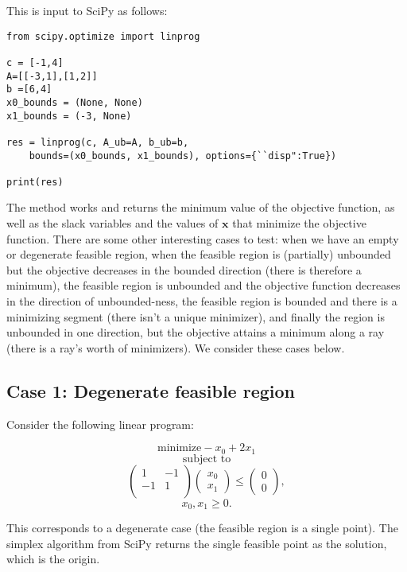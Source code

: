 \documentclass[12pt,english]{article}
\begin{document}
\noindent This is input to SciPy as follows:

\begin{lstlisting}
from scipy.optimize import linprog

c = [-1,4]
A=[[-3,1],[1,2]]
b =[6,4]
x0_bounds = (None, None)
x1_bounds = (-3, None)

res = linprog(c, A_ub=A, b_ub=b, 
	bounds=(x0_bounds, x1_bounds), options={``disp":True})
	
print(res)

\end{lstlisting}

The method works and returns the minimum value of the objective function, as well as the slack variables and the values of $\mathbf{x}$ that minimize the objective function.  There are some other interesting cases to test: when we have an empty or degenerate feasible region, when the feasible region is (partially) unbounded but the objective decreases in the bounded direction (there is therefore a minimum), the feasible region is unbounded and the objective function decreases in the direction of unbounded-ness, the feasible region is bounded and there is a minimizing segment (there isn't a unique minimizer), and finally the region is unbounded in one direction, but the objective attains a minimum along a ray (there is a ray's worth of minimizers).  We consider these cases below.

\subsection*{Case 1: Degenerate feasible region}

Consider the following linear program:

$$
\text{minimize} -x_0 + 2x_1
$$
$$
\text{subject to}
$$
$$
\left(
\begin{array}{cc}
1	&	-1 	\\
-1 	&	1     	\\
\end{array}
\right)
\left(
\begin{array}{c}
x_0 \\
x_1
\end{array}
\right)
\leq
\left(
\begin{array}{c}
0 \\
0
\end{array}
\right),
$$
$$
x_0, x_1 \geq 0.
$$

This corresponds to a degenerate case (the feasible region is a single point).  The simplex algorithm from SciPy returns the single feasible point as the solution, which is the origin.
\end{document}
